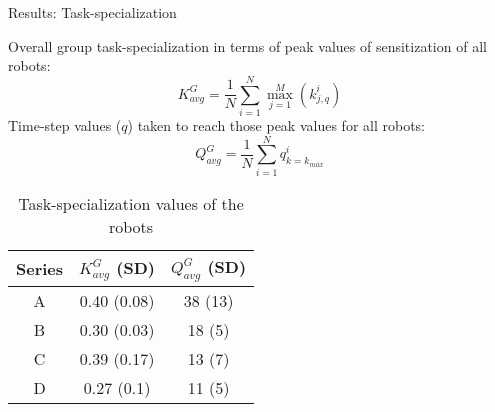 \documentclass{beamer}
\begin{document}
\begin{frame}[t]{Results: Task-specialization}
\begin{small}
\alert{Overall group task-specialization} in terms of peak values of sensitization of all robots:
\vspace*{-0.25cm}
\begin{equation}
K^G_{avg} = \frac{1}{N}\sum_{i=1}^{N} \max_{j=1}^M\left ( k^i_{j, q} \right ) 
\label{eqn:K-G}
\end{equation}
Time-step values ($q$) taken to reach those peak values for all robots:
\vspace*{-0.25cm}
\begin{equation}
Q^G_{avg}= \frac{1}{N}\sum_{i=1}^{N} q^i_{k=k_{max}}
\label{eqn:Q-G}
\end{equation}
\end{small}
\vspace*{-0.75cm}
\begin{table}
\begin{small}
\begin{center}
\caption{Task-specialization values of the robots}
\begin{tabular}{|c|c|c|}
\hline Series & \textbf{$ K^G_{avg}$} (SD) & \textbf{$ Q^G_{avg}$} (SD) \\ 
\hline \alert{A} & \alert{0.40} (0.08)& \alert{38} (13)\\ 
\hline B & 0.30 (0.03) & 18 (5)\\
\hline \alert{C}  & \alert{0.39} (0.17) & \alert{13} (7)\\
\hline D  & 0.27 (0.1) & 11 (5)\\
\hline
\end{tabular}
\label{table:motion-cmp} 
\end{center}
\end{small}
\end{table}
\end{frame}
\end{document}
